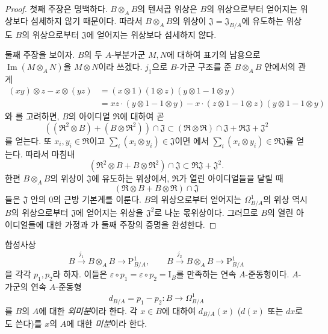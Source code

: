 \begin{proof}
첫째 주장은 명백하다. $B\otimes_A B$의 텐서곱 위상은 $B$의
위상으로부터 얻어지는 위상보다 섬세하지 않기 때문이다. 따라서
$B\otimes_A B$의 위상이
$\mathfrak J=\mathfrak J_{B/A}$에 유도하는 위상도 $B$의
위상으로부터 $\mathfrak J$에 얻어지는 위상보다 섬세하지 않다.

둘째 주장을 보이자. $B$의 두 $A$-부분가군 $M,N$에 대하여 표기의
남용으로 $\operatorname{Im}(M\otimes_A N)$을 $M\otimes N$이라
쓰겠다. $j_1$으로 $B$-가군 구조를 준 $B\otimes_A B$ 안에서의 관계
\[
\begin{aligned}
  (xy)\otimes z-x\otimes(yz)
  &=(x\otimes1)(1\otimes z)(y\otimes1-1\otimes y)\\
  &=xz\cdot(y\otimes1-1\otimes y)
    -x\cdot(z\otimes1-1\otimes z)(y\otimes1-1\otimes y)
\end{aligned}
\]
와 를 고려하면, $B$의 아이디얼 $\mathfrak R$에
대하여 곧
\[
  ((\mathfrak R^2\otimes B)+(B\otimes\mathfrak R^2))
  \cap\mathfrak J
  \subset
  (\mathfrak R\otimes\mathfrak R)\cap\mathfrak J
  +\mathfrak R\mathfrak J+\mathfrak J^2
\]
를 얻는다. 또 $x_i,y_i\in\mathfrak R$이고
$\sum_i(x_i\otimes y_i)\in\mathfrak J$이면
에서
$\sum_i(x_i\otimes y_i)\in\mathfrak R\mathfrak J$를 얻는다. 따라서
마침내
\begin{equation}
\tag{20.4.5.1}
\label{0.20.4.5.1-ko}
  (\mathfrak R^2\otimes B+B\otimes\mathfrak R^2)\cap\mathfrak J
  \subset\mathfrak R\mathfrak J+\mathfrak J^2.
\end{equation}
한편 $B\otimes_A B$의 위상이 $\mathfrak J$에 유도하는 위상에서,
$\mathfrak R$가 열린 아이디얼들을 달릴 때
\[
  (\mathfrak R\otimes B+B\otimes\mathfrak R)\cap\mathfrak J
\]
들은 $\mathfrak J$ 안의 $0$의 근방 기본계를 이룬다.
$B$의 위상으로부터 얻어지는 $\Omega^1_{B/A}$의 위상 역시
$B$의 위상으로부터 $\mathfrak J$에 얻어지는 위상을
$\mathfrak J^2$로 나눈 몫위상이다. 그러므로 $B$의 열린
아이디얼들에 대한 가정과 가 둘째 주장의 증명을
완성한다.
\end{proof}

\begin{definition}[20.4.6]
\label{0.20.4.6-ko}
합성사상
\[
  B\xrightarrow{j_1}B\otimes_A B\longrightarrow\mathrm P^1_{B/A},
  \qquad
  B\xrightarrow{j_2}B\otimes_A B\longrightarrow\mathrm P^1_{B/A}
\]
을 각각 $p_1,p_2$라 하자. 이들은
$\varepsilon\circ p_1=\varepsilon\circ p_2=\mathrm I_B$를 만족하는
연속 $A$-준동형이다. $A$-가군의 연속 $A$-준동형
\begin{equation}
\tag{20.4.6.1}
\label{0.20.4.6.1-ko}
  d_{B/A}=p_1-p_2:B\to\Omega^1_{B/A}
\end{equation}
를 $B$의 $A$에 대한 \emph{외미분}이라 한다. 각 $x\in B$에 대하여
$d_{B/A}(x)$ ($d(x)$ 또는 $dx$로도 쓴다)를 $x$의 $A$에 대한
\emph{미분}이라 한다.
\end{definition}

